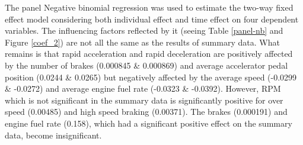 \documentclass[num-refs]{wiley-article}
\begin{document}
\begin{table}[htbp]
\caption{Model performances of Poisson and Negative binomial in the panel data set of drivers with six observations per driver.}
\label{comparison_xt}
\end{table}

The panel Negative binomial regression was used to estimate the two-way fixed effect model considering both individual effect and time effect on four dependent variables. The influencing factors reflected by it (seeing Table \ref{panel-nb} and Figure \ref{coef_2}) are not all the same as the results of summary data. What remains is that rapid acceleration and rapid deceleration are positively affected by the number of brakes (0.000845 \& 0.000869) and average accelerator pedal position (0.0244 \& 0.0265) but negatively affected by the average speed (-0.0299 \& -0.0272) and average engine fuel rate (-0.0323 \& -0.0392). However, RPM which is not significant in the summary data is significantly positive for over speed (0.00485) and high speed braking (0.00371). The brakes (0.000191) and engine fuel rate (0.158), which had a significant positive effect on the summary data, become insignificant.   
\end{document}
